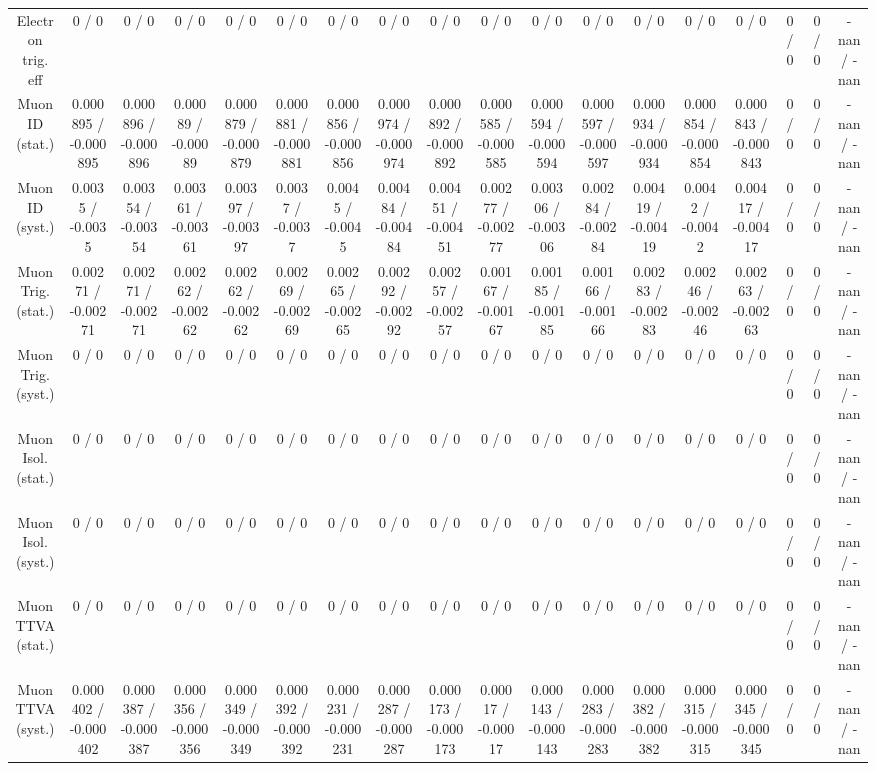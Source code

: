 \documentclass[10pt]{article}
\begin{document}
\begin{table}[htbp]
\begin{center}
\begin{tabular}{|c|c|c|c|c|c|c|c|c|c|c|c|c|c|c|c|c|c|}
  Electron trig. eff & 0 / 0 & 0 / 0 & 0 / 0 & 0 / 0 & 0 / 0 & 0 / 0 & 0 / 0 & 0 / 0 & 0 / 0 & 0 / 0 & 0 / 0 & 0 / 0 & 0 / 0 & 0 / 0 & 0 / 0 & 0 / 0 & -nan / -nan \\ 
  Muon ID (stat.) & 0.000895 / -0.000895 & 0.000896 / -0.000896 & 0.00089 / -0.00089 & 0.000879 / -0.000879 & 0.000881 / -0.000881 & 0.000856 / -0.000856 & 0.000974 / -0.000974 & 0.000892 / -0.000892 & 0.000585 / -0.000585 & 0.000594 / -0.000594 & 0.000597 / -0.000597 & 0.000934 / -0.000934 & 0.000854 / -0.000854 & 0.000843 / -0.000843 & 0 / 0 & 0 / 0 & -nan / -nan \\ 
  Muon ID (syst.) & 0.0035 / -0.0035 & 0.00354 / -0.00354 & 0.00361 / -0.00361 & 0.00397 / -0.00397 & 0.0037 / -0.0037 & 0.0045 / -0.0045 & 0.00484 / -0.00484 & 0.00451 / -0.00451 & 0.00277 / -0.00277 & 0.00306 / -0.00306 & 0.00284 / -0.00284 & 0.00419 / -0.00419 & 0.0042 / -0.0042 & 0.00417 / -0.00417 & 0 / 0 & 0 / 0 & -nan / -nan \\ 
  Muon Trig. (stat.) & 0.00271 / -0.00271 & 0.00271 / -0.00271 & 0.00262 / -0.00262 & 0.00262 / -0.00262 & 0.00269 / -0.00269 & 0.00265 / -0.00265 & 0.00292 / -0.00292 & 0.00257 / -0.00257 & 0.00167 / -0.00167 & 0.00185 / -0.00185 & 0.00166 / -0.00166 & 0.00283 / -0.00283 & 0.00246 / -0.00246 & 0.00263 / -0.00263 & 0 / 0 & 0 / 0 & -nan / -nan \\ 
  Muon Trig. (syst.) & 0 / 0 & 0 / 0 & 0 / 0 & 0 / 0 & 0 / 0 & 0 / 0 & 0 / 0 & 0 / 0 & 0 / 0 & 0 / 0 & 0 / 0 & 0 / 0 & 0 / 0 & 0 / 0 & 0 / 0 & 0 / 0 & -nan / -nan \\ 
  Muon Isol. (stat.) & 0 / 0 & 0 / 0 & 0 / 0 & 0 / 0 & 0 / 0 & 0 / 0 & 0 / 0 & 0 / 0 & 0 / 0 & 0 / 0 & 0 / 0 & 0 / 0 & 0 / 0 & 0 / 0 & 0 / 0 & 0 / 0 & -nan / -nan \\ 
  Muon Isol. (syst.) & 0 / 0 & 0 / 0 & 0 / 0 & 0 / 0 & 0 / 0 & 0 / 0 & 0 / 0 & 0 / 0 & 0 / 0 & 0 / 0 & 0 / 0 & 0 / 0 & 0 / 0 & 0 / 0 & 0 / 0 & 0 / 0 & -nan / -nan \\ 
  Muon TTVA (stat.) & 0 / 0 & 0 / 0 & 0 / 0 & 0 / 0 & 0 / 0 & 0 / 0 & 0 / 0 & 0 / 0 & 0 / 0 & 0 / 0 & 0 / 0 & 0 / 0 & 0 / 0 & 0 / 0 & 0 / 0 & 0 / 0 & -nan / -nan \\ 
  Muon TTVA (syst.) & 0.000402 / -0.000402 & 0.000387 / -0.000387 & 0.000356 / -0.000356 & 0.000349 / -0.000349 & 0.000392 / -0.000392 & 0.000231 / -0.000231 & 0.000287 / -0.000287 & 0.000173 / -0.000173 & 0.00017 / -0.00017 & 0.000143 / -0.000143 & 0.000283 / -0.000283 & 0.000382 / -0.000382 & 0.000315 / -0.000315 & 0.000345 / -0.000345 & 0 / 0 & 0 / 0 & -nan / -nan \\ 

\end{tabular}
\end{center}
\end{table}
\end{document}

